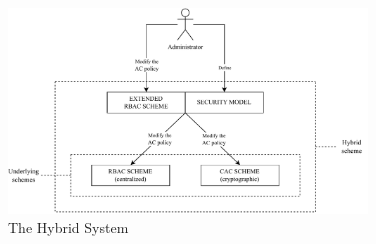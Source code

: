 \begin{figure}[t!]
	\centering
	
	\includegraphics[width=0.85\textwidth]{assets/img2/hybrid.pdf}
	
	\caption{The Hybrid System}
	\label{fig:hybrid}
\end{figure}

	
		
		
	



